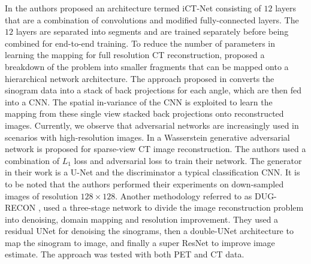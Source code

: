 In \cite{li2019learning} the authors proposed an architecture termed iCT-Net  consisting of $12$ layers that are a combination of convolutions and modified fully-connected layers. The $12$ layers are separated into segments and are trained separately before being combined for end-to-end training. To reduce the number of parameters in learning the mapping for full resolution \ac{CT} reconstruction, \cite{fu2019hierarchical} proposed a breakdown of the problem into smaller fragments that can be mapped onto a hierarchical network architecture. The approach proposed in \cite{ye2018deep} converts the sinogram data into a stack of back projections for each angle, which are then fed into a \ac{CNN}. The spatial in-variance of the \ac{CNN} is exploited to learn the mapping from these single view stacked back projections onto reconstructed images. Currently, we observe that adversarial networks are increasingly used in scenarios with high-resolution images. In \cite{thaler2018sparse} a Wasserstein generative adversarial network \cite{arjovsky2017wasserstein} is proposed for sparse-view \ac{CT} image reconstruction. The authors used a combination of $L_1$ loss and adversarial loss to train their network. The generator in their work is a U-Net and the discriminator a typical classification \ac{CNN}. It is to be noted that the authors performed their experiments on down-sampled images of resolution $128\times 128$. Another methodology referred to as DUG-RECON \cite{kandarpa2020dug}, used a three-stage network to divide the image reconstruction problem into denoising, domain mapping and resolution improvement. They used a residual UNet for denoising the sinograms, then a double-UNet architecture to map the sinogram to image, and finally a super ResNet to improve image estimate. The approach was tested with both \ac{PET} and \ac{CT} data. 




